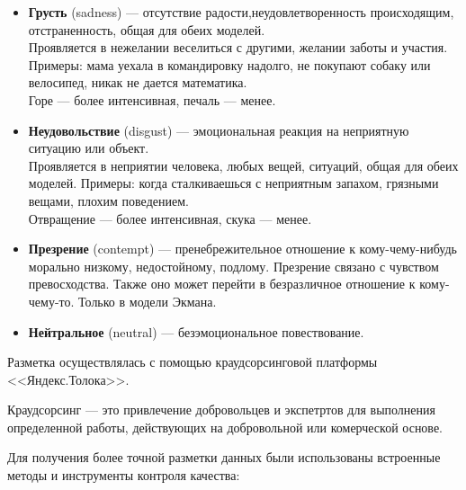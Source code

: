 \begin{itemize}
\item \textbf{Грусть} (sadness) --- отсутствие радости,​ неудовлетворенность происходящим, отстраненность, общая для обеих моделей.\\
Проявляется в нежелании веселиться с другими, желании заботы и участия.
Примеры: мама уехала в командировку надолго, не покупают собаку или велосипед, никак не дается математика.\\
Горе --- более интенсивная, печаль --- менее.

\item \textbf{Неудовольствие} (disgust) --- эмоциональная реакция на неприятную ситуацию или объект.\\
Проявляется в неприятии человека, любых вещей, ситуаций, общая для обеих моделей.
Примеры: когда сталкиваешься с неприятным запахом, грязными вещами, плохим поведением.\\
Отвращение --- более интенсивная, скука --- менее.

\item \textbf{Презрение} (contempt) --- пренебрежительное отношение к кому-чему-нибудь морально низкому, недостойному, подлому. Презрение связано с чувством превосходства. Также оно может перейти в безразличное отношение к кому-чему-то. Только в модели Экмана.

\item \textbf{Нейтральное} (neutral) --- безэмоциональное повествование.

\end{itemize}

\bigskip
Разметка осуществлялась с помощью краудсорсинговой платформы <<Яндекс.Толока>>.

\begin{definition}
 Краудсорсинг --- это привлечение добровольцев и экспетртов для выполнения определенной работы, действующих на добровольной или комерческой основе.
\end{definition}

Для получения более точной разметки данных были использованы встроенные методы и инструменты контроля качества:

